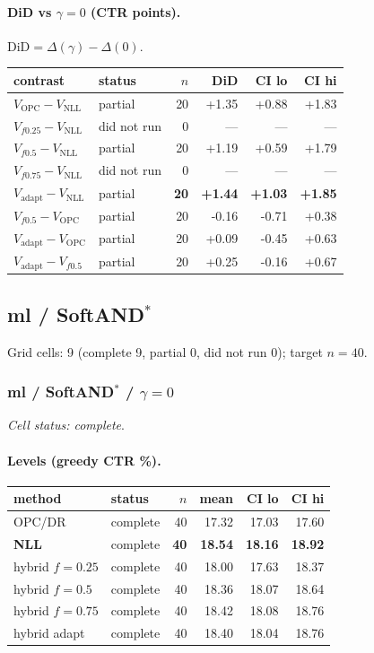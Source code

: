 \documentclass[10pt,a4paper]{article}
\begin{document}
\paragraph{DiD vs $\gamma=0$ (CTR points).} $\mathrm{DiD}=\Delta(\gamma)-\Delta(0)$.
{\centering\small\begin{tabular}{llrrrr}
\toprule contrast & status & $n$ & DiD & CI lo & CI hi \\
\midrule
$V_{\mathrm{OPC}}-V_{\mathrm{NLL}}$ & partial & 20 & +1.35 & +0.88 & +1.83 \\
$V_{f0.25}-V_{\mathrm{NLL}}$ & did not run & 0 & --- & --- & --- \\
$V_{f0.5}-V_{\mathrm{NLL}}$ & partial & 20 & +1.19 & +0.59 & +1.79 \\
$V_{f0.75}-V_{\mathrm{NLL}}$ & did not run & 0 & --- & --- & --- \\
\textbf{$V_{\mathrm{adapt}}-V_{\mathrm{NLL}}$} & partial & \textbf{20} & \textbf{+1.44} & \textbf{+1.03} & \textbf{+1.85} \\
$V_{f0.5}-V_{\mathrm{OPC}}$ & partial & 20 & -0.16 & -0.71 & +0.38 \\
$V_{\mathrm{adapt}}-V_{\mathrm{OPC}}$ & partial & 20 & +0.09 & -0.45 & +0.63 \\
$V_{\mathrm{adapt}}-V_{f0.5}$ & partial & 20 & +0.25 & -0.16 & +0.67 \\
\bottomrule\end{tabular}\par}
\bigskip
\newpage
\subsection{ml / SoftAND$^*$}
Grid cells: 9 (complete 9, partial 0, did not run 0); target $n=40$.
\subsubsection{ml / SoftAND$^*$ / $\gamma=0$}
\emph{Cell status: complete}.
\paragraph{Levels (greedy CTR \%).}
{\centering\small\begin{tabular}{llrrrr}
\toprule method & status & $n$ & mean & CI lo & CI hi \\
\midrule
OPC/DR & complete & 40 & 17.32 & 17.03 & 17.60 \\
\textbf{NLL} & complete & \textbf{40} & \textbf{18.54} & \textbf{18.16} & \textbf{18.92} \\
hybrid $f{=}0.25$ & complete & 40 & 18.00 & 17.63 & 18.37 \\
hybrid $f{=}0.5$ & complete & 40 & 18.36 & 18.07 & 18.64 \\
hybrid $f{=}0.75$ & complete & 40 & 18.42 & 18.08 & 18.76 \\
hybrid adapt & complete & 40 & 18.40 & 18.04 & 18.76 \\
\bottomrule\end{tabular}\par}
\end{document}
